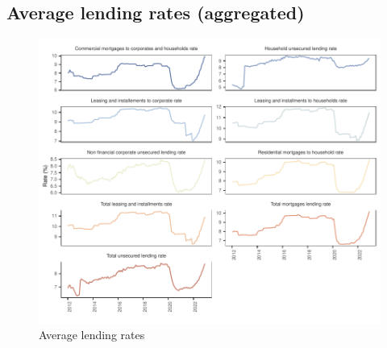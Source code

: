 \documentclass[
  letterpaper,
  DIV=11,
  numbers=noendperiod]{scrartcl}
\begin{document}
\newpage

\hypertarget{average-lending-rates-aggregated}{%
\subsection{Average lending rates
(aggregated)}\label{average-lending-rates-aggregated}}

\begin{figure}[H]

{\centering \includegraphics{UP_paper_files/figure-pdf/fig-bank_interest_rates-1.pdf}

}

\caption{\label{fig-bank_interest_rates}Average lending rates}

\end{figure}
\end{document}
